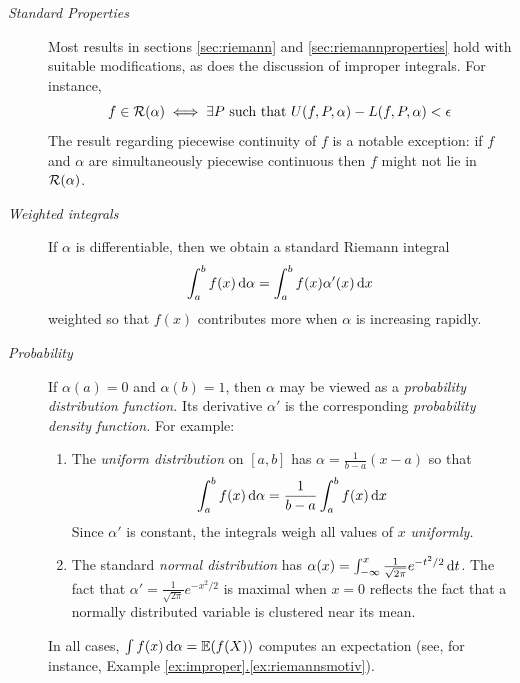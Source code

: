 \begin{description}
	\item[\normalfont\emph{Standard Properties}] Most results in sections \ref{sec:riemann} and \ref{sec:riemannproperties} hold with suitable modifications, as does the discussion of improper integrals. For instance,
  \[f\in\mathcal{R}(\alpha) \iff \exists P\text{ such that }U(f,P,\alpha)-L(f,P,\alpha)<\epsilon\]
  The result regarding piecewise continuity of $f$ is a notable exception: if $f$ and $\alpha$ are simultaneously piecewise continuous then $f$ might not lie in $\mathcal{R}(\alpha)$.
  	
	\item[\normalfont\emph{Weighted integrals}] If $\alpha$ is differentiable, then we obtain a standard Riemann integral
  \[\int_a^bf(x)\,\mathrm{d}\alpha =\int_a^bf(x)\alpha'(x)\,{\mathrm{d} x}\]
  weighted so that $f(x)$ contributes more when $\alpha$ is increasing rapidly. 
  
  \goodbreak
  
  \item[\normalfont\emph{Probability}] If $\alpha(a)=0$ and $\alpha(b)=1$, then $\alpha$ may be viewed as a \emph{probability distribution function.}%
  Its derivative $\alpha'$ is the corresponding \emph{probability density function.} For example:
  \begin{enumerate}
    \item The \emph{uniform distribution} on $[a,b]$ has $\alpha=\frac 1{b-a}(x-a)$ so that
    \[\int_a^bf(x)\,\mathrm{d}\alpha =\frac 1{b-a}\int_a^bf(x)\,{\mathrm{d} x}\] 
    Since $\alpha'$ is constant, the integrals weigh all values of $x$ \emph{uniformly.}
    \item The standard \emph{normal distribution} has $\alpha(x)=\int_{-\infty}^x\frac 1{\sqrt{2\pi}}e^{-t^2/2}\,{\mathrm{d} t}$. The fact that $\alpha'=\frac 1{\sqrt{2\pi}}e^{-x^2/2}$ is maximal when $x=0$ reflects the fact that a normally distributed variable is clustered near its mean.
  \end{enumerate}
  In all cases, $\int f(x)\,\mathrm{d}\alpha=\mathbb{E}(f(X))$ computes an expectation (see, for instance, Example \hyperref[ex:riemannsmotiv]{\ref*{ex:improper}.\ref*{ex:riemannsmotiv}}).
  
  \goodbreak


\end{description}
